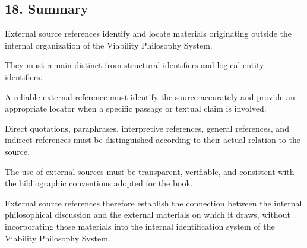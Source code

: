 \subsection*{18. Summary}

External source references
identify and locate materials
originating outside the
internal organization of
the Viability Philosophy
System.

They must remain distinct
from structural identifiers
and logical entity identifiers.

A reliable external reference
must identify the source
accurately and provide
an appropriate locator
when a specific passage
or textual claim is involved.

Direct quotations, paraphrases,
interpretive references,
general references, and
indirect references must
be distinguished according
to their actual relation
to the source.

The use of external sources
must be transparent, verifiable,
and consistent with the
bibliographic conventions
adopted for the book.

External source references
therefore establish the
connection between the
internal philosophical
discussion and the external
materials on which it
draws, without incorporating
those materials into the
internal identification
system of the Viability
Philosophy System.

\cleardoublepage

